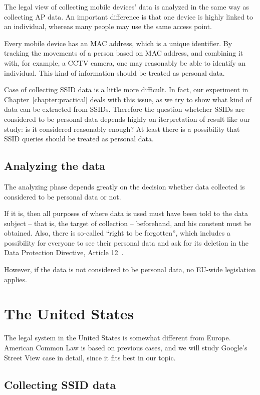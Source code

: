 \documentclass[12pt,a4paper,oneside,pdftex]{report}
\begin{document}
The legal view of collecting mobile devices' data is analyzed in the same way as collecting AP data. An important difference is that one device is highly linked to an individual, whereas many people may use the same access point.

Every mobile device has an MAC address, which is a unique identifier. By tracking the movements of a person based on MAC address, and combining it with, for example, a CCTV camera, one may reasonably be able to identify an individual. This kind of information should be treated as personal data.

Case of collecting SSID data is a little more difficult. In fact, our experiment in Chapter~\ref{chapter:practical} deals with this issue, as we try to show what kind of data can be extracted from SSIDs. Therefore the question wheteher SSIDs are considered to be personal data depends highly on iterpretation of result like our study: is it considered reasonably enough? At least there is a possibility that SSID queries should be treated as personal data.

\subsection{Analyzing the data}

The analyzing phase depends greatly on the decision whether data collected is considered to be personal data or not. 

If it is, then all purposes of where data is used must have been told to the data subject -- that is, the target of collection -- beforehand, and his constent must be obtained. Also, there is so-called ``right to be forgotten'', which includes a possibility for everyone to see their personal data and ask for its deletion in the Data Protection Directive, Article 12~\cite{data_protection}. 

However, if the data is not considered to be personal data, no EU-wide legislation applies. 


\section{The United States}

The legal system in the United States is somewhat different from Europe. American Common Law is based on previous cases, and we will study Google's Street View case in detail, since it fits best in our topic.

\subsection{Collecting SSID data}
\label{subsec:us_collecting}
\end{document}
